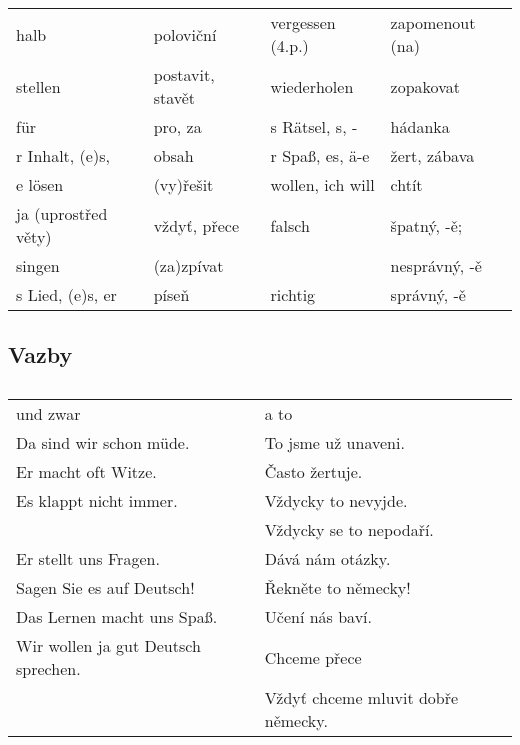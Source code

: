 \begin{table}[ht!]
\begin{tabular}{llll}
          halb                 & poloviční          & vergessen (4.p.) & zapomenout (na)          \\
          stellen              & postavit, stavět   & wiederholen      & zopakovat                \\
          für                  & pro, za            & s Rätsel, s, -   & hádanka                  \\
        \hline
          r Inhalt, (e)s,      & obsah              & r Spaß, es, ä-e  & žert, zábava             \\
          e lösen              & (vy)řešit          & wollen, ich will & chtít                    \\
          ja {\scriptsize (uprostřed věty)} & vždyť, přece   & falsch  & špatný, -ě;              \\
          singen               & (za)zpívat         &                  & nesprávný, -ě            \\
          s Lied, (e)s, er     & píseň              & richtig          & správný, -ě              \\
        \hline 
      \end{tabular}
      \caption*{ }
    \end{table}

    \subsection*{Vazby}
      \begin{table}[ht!]   %
        \begin{tabular}{ll}
          \hline
          und zwar                            & a to                                             \\
          Da sind wir schon müde.             & To jsme už unaveni.                              \\
          Er macht oft Witze.                 & Často žertuje.                                   \\
          Es klappt nicht immer.              & Vždycky to nevyjde.                              \\
                                              & Vždycky se to nepodaří.                          \\
          Er stellt uns Fragen.               & Dává nám otázky.                                 \\
          Sagen Sie es auf Deutsch!           & Řekněte to německy!                              \\
          Das Lernen macht uns Spaß.          & Učení nás baví.                                  \\
          Wir wollen ja gut Deutsch sprechen. & Chceme přece                                     \\
                                              & Vždyť chceme mluvit dobře německy.               \\
          \hline
        \end{tabular}
        \caption*{ }
      \end{table}
      

